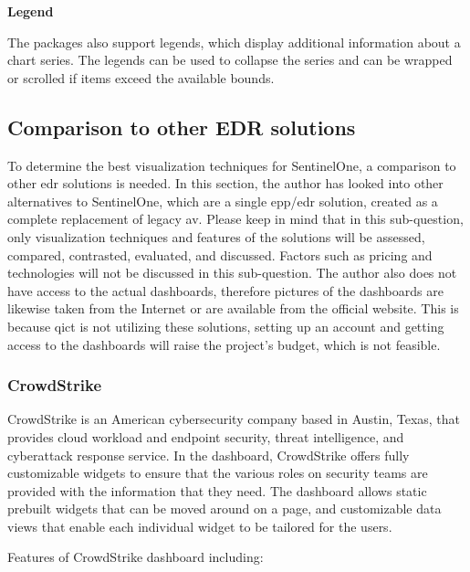 \begin{multicols}{2}
      \textbf{Legend}

      The packages also support legends, which display additional information about a chart series. The legends
      can be used to collapse the series and can be wrapped or scrolled if items exceed the available bounds.

      \subsection{Comparison to other EDR solutions}
      To determine the best visualization techniques for SentinelOne, a comparison to other \acrshort{edr}
      solutions is needed. In this section, the author has looked into other alternatives to SentinelOne, which are
      a single \acrshort{epp}/\acrshort{edr} solution, created as a complete replacement of legacy \acrshort{av}.
      Please keep in mind that in this sub-question, only visualization techniques and features of the solutions
      will be assessed, compared, contrasted, evaluated, and discussed. Factors such as pricing and technologies
      will not be discussed in this sub-question. The author also does not have access to the actual dashboards,
      therefore pictures of the dashboards are likewise taken from the Internet or are available from the official
      website. This is because \acrshort{qict} is not utilizing these solutions, setting up an account and getting
      access to the dashboards will raise the project's budget, which is not feasible.

      \subsubsection{CrowdStrike}

      CrowdStrike is an American cybersecurity company based in Austin, Texas, that provides cloud workload and
      endpoint security, threat intelligence, and cyberattack response service. In the dashboard, CrowdStrike
      offers fully customizable widgets to ensure that the various roles on security teams are provided with
      the information that they need. The dashboard allows static prebuilt widgets that can be moved around on
      a page, and customizable data views that enable each individual widget to be tailored for the users.

      Features of CrowdStrike dashboard including:


\end{multicols}
